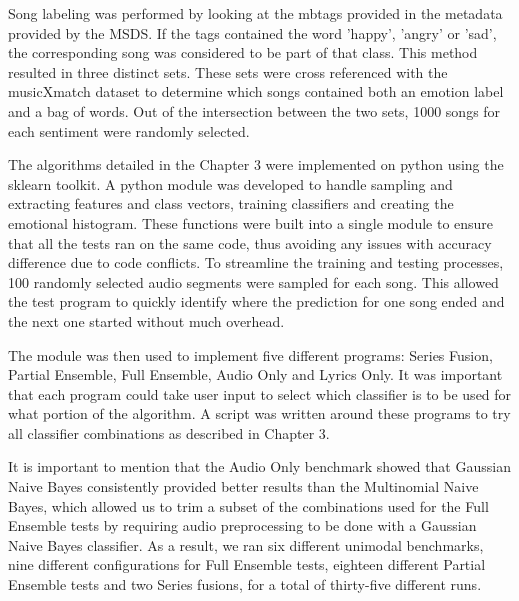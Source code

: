 Song labeling was performed by looking at the mbtags provided in the metadata provided by the MSDS. If the tags contained the word 'happy', 'angry' or 'sad', the corresponding song was considered to be part of that class. This method resulted in three distinct sets. These sets were cross referenced with the musicXmatch dataset to determine which songs contained both an emotion label and a bag of words.   Out of the intersection between the two sets, 1000 songs for each sentiment were randomly selected.

The algorithms detailed in the Chapter 3 were implemented on python using the sklearn toolkit\protect\footnotemark.   A python module was developed to handle sampling and extracting features and class vectors, training classifiers and creating the emotional histogram.  These functions were built into a single module to ensure that all the tests ran on the same code, thus avoiding any issues with accuracy difference due to code conflicts. To streamline the training and testing processes, 100 randomly selected audio segments were sampled for each song. This allowed the test program to quickly identify where the prediction for one song ended and the next one started without much overhead.

The module was then used to implement five different programs: Series Fusion, Partial Ensemble, Full Ensemble, Audio Only and Lyrics Only.  It was important that each program could take user input to select which classifier is to be used for what portion of the algorithm.  A script was written around these programs to try all classifier combinations as described in Chapter 3. 

It is important to mention that the Audio Only benchmark showed that Gaussian Naive Bayes consistently provided better results than the Multinomial Naive Bayes, which allowed us to trim a subset of the combinations used for the Full Ensemble tests by requiring audio preprocessing to be done with a Gaussian Naive Bayes classifier. As a result, we ran six different unimodal benchmarks, nine different configurations for Full Ensemble tests, eighteen different Partial Ensemble tests and two Series fusions, for a total of thirty-five different runs.

